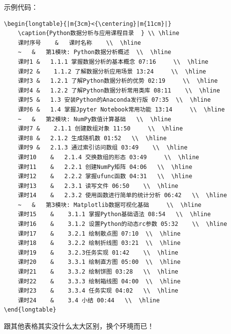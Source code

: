 \documentclass[cn,chinese,color=cyan]{elegantbook}
\begin{document}
示例代码：
\begin{lstlisting}[style=R]
\begin{longtable}{|m{3cm}<{\centering}|m{11cm}|}
	\caption{Python数据分析与应用课程目录  } \\ \hline
	课时序号	&	课时名称	\\	\hline
	~	&	第1模块: Python数据分析概述 	\\	\hline
	课时1	&	1.1.1 掌握数据分析的基本概念 07:16 	\\	\hline
	课时2	&	 1.1.2 了解数据分析应用场景 13:24 	\\	\hline
	课时3	&	1.2.1 了解Python数据分析的优势 02:19 	\\	\hline
	课时4	&	1.2.2 了解Python数据分析常用类库 08:11 	\\	\hline
	课时5	&	1.3 安装Python的Anaconda发行版 07:35 	\\	\hline
	课时6	&	1.4 掌握Jpyter Notebook常用功能 13:14 	\\	\hline
	~	&	第2模块: NumPy数值计算基础 	\\	\hline
	课时7	&	 2.1.1 创建数组对象 11:50 	\\	\hline
	课时8	&	2.1.2 生成随机数 01:52 	\\	\hline
	课时9	&	2.1.3 通过索引访问数组 03:49 	\\	\hline
	课时10	&	2.1.4 交换数组的形态 03:49 	\\	\hline
	课时11	&	2.2.1 创建NumPy矩阵 04:06 	\\	\hline
	课时12	&	2.2.2 掌握ufunc函数 04:31 	\\	\hline
	课时13	&	2.3.1 读写文件 06:50 	\\	\hline
	课时14	&	2.3.2 使用函数进行简单的统计分析 06:42 	\\	\hline
	~	&	第3模块: Matplotlib数据可视化基础 	\\	\hline
	课时15	&	 3.1.1 掌握Python基础语法 08:54 	\\	\hline
	课时16	&	 3.1.2 设置Python的动态rc参数 05:32 	\\	\hline
	课时17	&	 3.2.1 绘制散点图 07:10 	\\	\hline
	课时18	&	 3.2.2 绘制折线图 03:21 	\\	\hline
	课时19	&	 3.2.3任务实现 01:42 	\\	\hline
	课时20	&	 3.3.1 绘制直方图 05:00 	\\	\hline
	课时21	&	 3.3.2 绘制饼图 03:28 	\\	\hline
	课时22	&	 3.3.3 绘制箱线图 04:00 	\\	\hline
	课时23	&	 3.3.4 任务实现 04:02 	\\	\hline
	课时24	&	 3.4 小结 00:44 	\\	\hline
\end{longtable}
\end{lstlisting}
\begin{note}
	跟其他表格其实没什么太大区别，换个环境而已！
\end{note}
\end{document}
